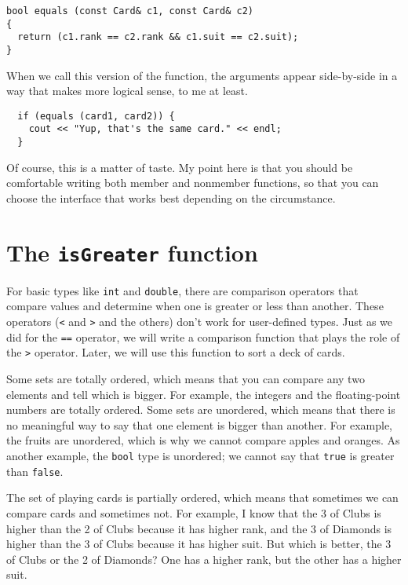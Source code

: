 \begin{verbatim}
bool equals (const Card& c1, const Card& c2)
{
  return (c1.rank == c2.rank && c1.suit == c2.suit);
}
\end{verbatim}
%
When we call this version of the function, the arguments
appear side-by-side in a way that makes more logical sense,
to me at least.

\begin{verbatim}
  if (equals (card1, card2)) {
    cout << "Yup, that's the same card." << endl;
  }
\end{verbatim}
%
Of course, this is a matter of taste.  My point here is that
you should be comfortable writing both member and nonmember
functions, so that you can choose the interface that works best
depending on the circumstance.

\section{The {\tt isGreater} function}

For basic types like {\tt int} and {\tt double}, there are comparison
operators that compare values and determine when one is greater or
less than another.  These operators ({\tt <} and {\tt >} and the
others) don't work for user-defined types.  Just as we did for the
{\tt ==} operator, we will write a comparison function that plays
the role of the {\tt >} operator.  Later, we will use this function to
sort a deck of cards.


Some sets are totally ordered, which means that you can compare any
two elements and tell which is bigger.  For example, the integers and
the floating-point numbers are totally ordered.  Some sets are
unordered, which means that there is no meaningful way to say that one
element is bigger than another.  For example, the fruits are
unordered, which is why we cannot compare apples and oranges.  As
another example, the {\tt bool} type is unordered; we cannot say that
{\tt true} is greater than {\tt false}.

The set of playing cards is partially ordered, which means that
sometimes we can compare cards and sometimes not.  For example, I know
that the 3 of Clubs is higher than the 2 of Clubs because it has
higher rank, and the 3 of Diamonds is higher than the 3 of Clubs
because it has higher suit.  But which is better, the 3 of Clubs or
the 2 of Diamonds?  One has a higher rank, but the other has a higher
suit.

